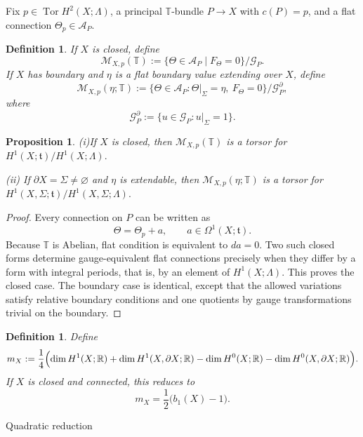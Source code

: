 \documentclass[12pt]{amsart}
\makeatletter
\renewcommand\subsection{\@startsection{subsection}{2}%
  \z@{.5\linespacing\@plus.7\linespacing}{-.5em}%
  {\normalfont\bfseries}}
\numberwithin{equation}{section}
\newtheorem{prop}[theorem]{Proposition}
\newtheorem{definition}[theorem]{Definition}
\makeatother
\begin{document}
Fix \(p\in \operatorname{Tor}H^2(X;\Lambda)\), a principal \(\mathbb T\)-bundle \(P\to X\) with
\(c(P)=p\), and a flat connection \(\Theta_p\in \mathcal A_P\).

\begin{definition}
If \(X\) is closed, define
\[
\mathcal M_{X,p}(\mathbb T)
:=
\{\Theta\in \mathcal A_P \mid F_\Theta=0\}/\mathcal G_P.
\]
If \(X\) has boundary and \(\eta\) is a flat boundary value extending over \(X\), define
\[
\mathcal M_{X,p}(\eta;\mathbb T)
:=
\{\Theta\in \mathcal A_P:\Theta|_\Sigma=\eta,\ F_\Theta=0\}/\mathcal G_P^\partial,
\]
where
\[
\mathcal G_P^\partial:=\{u\in \mathcal G_P:u|_\Sigma=1\}.
\]
\end{definition}

\begin{prop}
\label{prop:moduli-torsor-toral}
(i)If \(X\) is closed, then  \(\mathcal M_{X,p}(\mathbb T)\) is a torsor for $H^1(X;\mathfrak t)/H^1(X;\Lambda).$

\noindent(ii) If \(\partial X=\Sigma\neq\varnothing\) and \(\eta\) is extendable, then \(\mathcal M_{X,p}(\eta;\mathbb T)\) is a torsor for \\
$H^1(X,\Sigma;\mathfrak t)/H^1(X,\Sigma;\Lambda).$
\end{prop}

\begin{proof}
Every connection on \(P\) can be written as
\[
\Theta=\Theta_p+a,\qquad a\in \Omega^1(X;\mathfrak t).
\]
Because \(\mathbb T\) is Abelian, flat condition is equivalent to \(da=0\). Two such closed forms
determine gauge-equivalent flat connections precisely when they differ by a form with
integral periods, that is, by an element of \(H^1(X;\Lambda)\). This proves the closed case.
The boundary case is identical, except that the allowed variations satisfy relative boundary
conditions and one quotients by gauge transformations trivial on the boundary.
\end{proof}

\begin{definition}
\label{def:mX-toral}
Define
\[
m_X
:=
\frac14\Bigl(
\dim H^1(X;\mathbb R)+\dim H^1(X,\partial X;\mathbb R)
-\dim H^0(X;\mathbb R)-\dim H^0(X,\partial X;\mathbb R)
\Bigr).
\]
If \(X\) is closed and connected, this reduces to
\[
m_X=\frac12\bigl(b_1(X)-1\bigr).
\]
\end{definition}

\subsection{Quadratic reduction}
\end{document}
